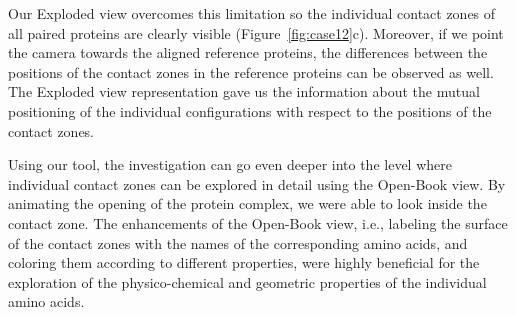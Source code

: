 \documentclass{bmcart}
\def\OpBook {Open-Book view\xspace}
\def\ExpView {Exploded view\xspace}
\begin{document}
Our \ExpView overcomes this limitation so the individual contact zones of all paired proteins are clearly visible (Figure~\ref{fig:case12}c).
Moreover, if we point the camera towards the aligned reference proteins, the differences between the positions of the contact zones in the reference proteins can be observed as well.
The \ExpView representation gave us the information about the mutual positioning of the individual configurations with respect to the positions of the contact zones.

Using our tool, the investigation can go even deeper into the level where individual contact zones can be explored in detail using the \OpBook.
By animating the opening of the protein complex, we were able to look inside the contact zone.
The enhancements of the \OpBook, i.e., labeling the surface of the contact zones with the names of the corresponding amino acids, and coloring them according to different properties, were highly beneficial for the exploration of the physico-chemical and geometric properties of the individual amino acids.%






\end{document}
